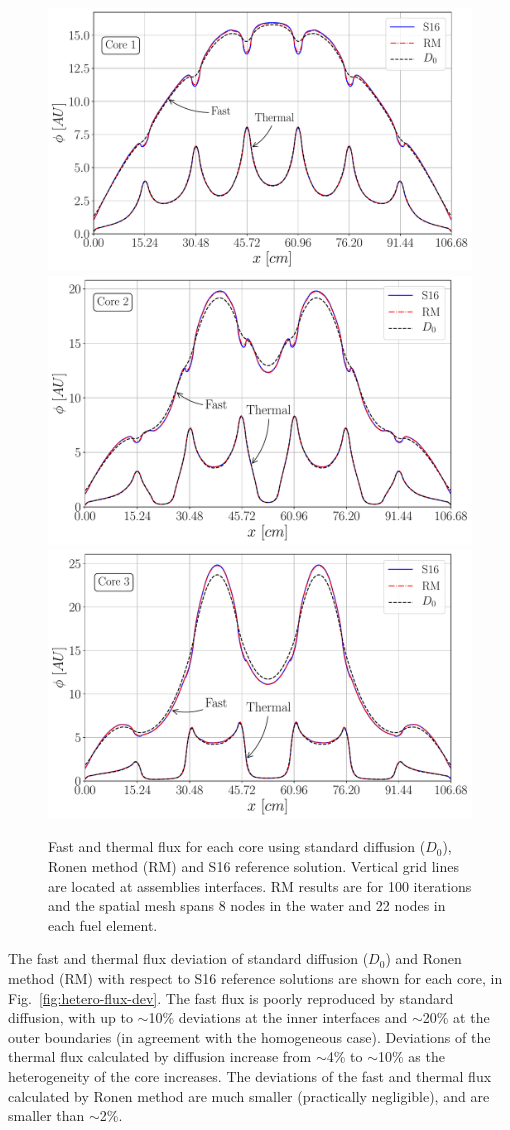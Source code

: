 \begin{figure}[htbp!]
	\centering
	\includegraphics[width=0.49\linewidth]{Sn_Diff_RM_core_1.pdf}
	\includegraphics[width=0.49\linewidth]{Sn_Diff_RM_core_2.pdf}
	\includegraphics[width=0.49\linewidth]{Sn_Diff_RM_core_3.pdf}
	\caption{Fast and thermal flux for each core using standard diffusion ($D_0$), Ronen method (RM) and S16 reference solution. Vertical grid lines are located at assemblies interfaces. RM results are for 100 iterations and the spatial mesh spans 8 nodes in the water and 22 nodes in each fuel element.}
	\label{fig:hetero-flux}
\end{figure}

The fast and thermal flux deviation of standard diffusion ($D_0$) and Ronen method (RM) with respect to S16 reference solutions are shown for each core, in Fig.~\ref{fig:hetero-flux-dev}. The fast flux is poorly reproduced by standard diffusion, with up to $\sim$10\% deviations at the inner interfaces and $\sim$20\% at the outer boundaries (in agreement with the homogeneous case). Deviations of the thermal flux calculated by diffusion increase from $\sim$4\% to $\sim$10\% as the heterogeneity of the core increases. The deviations of the fast and thermal flux calculated by Ronen method are much smaller (practically negligible), and are smaller than $\sim$2\%. 

